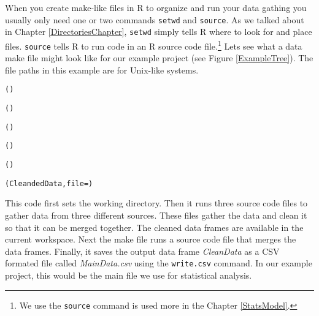 When you create make-like files in R to organize and run your data gathing you usually only need one or two commands {\tt{setwd}} and {\tt{source}}. As we talked about in Chapter \ref{DirectoriesChapter}, {\tt{setwd}} simply tells R where to look for and place files. {\tt{source}} tells R to run code in an R source code file.\footnote{We use the {\tt{source}} command is used more in the Chapter \ref{StatsModel}.}  Lets see what a data make file might look like for our example project (see Figure \ref{ExampleTree}). The file paths in this example are for Unix-like systems.

\begin{knitrout}
\color{fgcolor}\begin{kframe}
\begin{alltt}
\hlcomment{################}
\hlcomment{################}

()

()

()

()
	
()

(CleandedData, file = )
\end{alltt}
\end{kframe}
\end{knitrout}


This code first sets the working directory. Then it runs three source code files to gather data from three different sources. These files gather the data and clean it so that it can be merged together. The cleaned data frames are available in the current workspace. Next the make file runs a source code file that merges the data frames. Finally, it saves the output data frame {\emph{CleanData}} as a CSV formated file called {\emph{MainData.csv}} using the {\tt{write.csv}} command. In our example project, this would be the main file we use for statistical analysis. 

